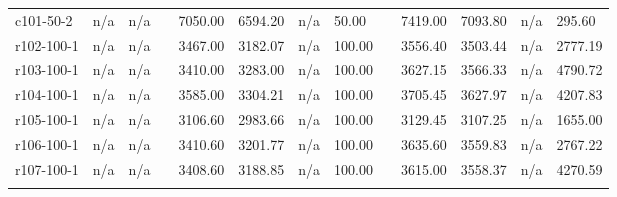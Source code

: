 \documentclass[final,5p,times,twocolumn]{elsarticle}
\begin{document}
{{{{{{{{{{{{{\begin{longtable}{l l l l l l l l l l l l l}
c101-50-2& n/a& n/a&&7050.00& 6594.20& n/a& 50.00&&7419.00& 7093.80& n/a& 295.60\\
r102-100-1& n/a& n/a&&3467.00& 3182.07& n/a& 100.00&&3556.40& 3503.44& n/a& 2777.19\\
r103-100-1& n/a& n/a&&3410.00& 3283.00& n/a& 100.00&&3627.15& 3566.33& n/a& 4790.72\\
r104-100-1& n/a& n/a&&3585.00& 3304.21& n/a& 100.00&&3705.45& 3627.97& n/a& 4207.83\\
r105-100-1& n/a& n/a&&3106.60& 2983.66& n/a& 100.00&&3129.45& 3107.25& n/a& 1655.00\\
r106-100-1& n/a& n/a&&3410.60& 3201.77& n/a& 100.00&&3635.60& 3559.83& n/a& 2767.22\\
r107-100-1& n/a& n/a&&3408.60& 3188.85& n/a& 100.00&&3615.00& 3558.37& n/a& 4270.59\\
\hline
\label{tab:bm_A1}
\end{longtable}

}}}}}}}}}}}}}
\end{document}
